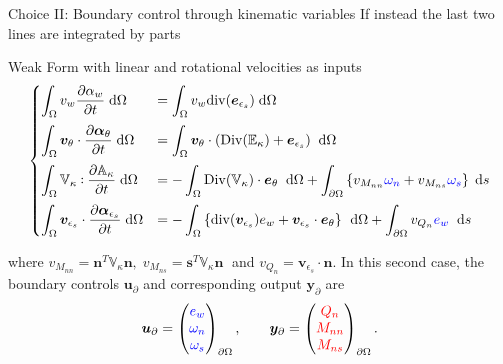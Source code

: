 \documentclass{beamer}
\def\onedot{$\mathsurround0pt\ldotp$}
\def\cddot{%
	\mathbin{\vcenter{\baselineskip.67ex
			\hbox{\onedot}\hbox{\onedot}}%
}}
\newcommand{\blue}[1]{\textcolor{blue}{#1}}
\newcommand{\red}[1]{\textcolor{red}{#1}}
\begin{document}
\begin{frame}{Choice II: Boundary control through kinematic variables}
	If instead the last two lines are integrated by parts
	\begin{exampleblock}{Weak Form with linear and rotational velocities as inputs}
	\scriptsize
	\begin{equation*}
	\begin{cases}
	\displaystyle\int_{\Omega} v_w \diffp{\alpha_w}{t}  \d\Omega  &= \displaystyle \int_{\Omega} v_w \mathrm{div}(\bm{e}_{\epsilon_s})  \d\Omega \vspace{2mm}\\
	\displaystyle\int_{\Omega} \bm{v}_{\theta} \cdot \diffp{\bm\alpha_{\theta}}{t}   \d\Omega &= \displaystyle \int_{\Omega} \bm{v}_{\theta} \cdot (\mathrm{Div}(\mathbb{E}_{\kappa}) + \bm{e}_{\epsilon_s}) \;  \d\Omega \vspace{2mm} \\
	\displaystyle\int_{\Omega} \mathbb{V}_{\kappa} \cddot \diffp{\mathbb{A}_{\kappa}}{t}   \d\Omega &= - \displaystyle\int_{\Omega} \mathrm{Div}(\mathbb{V}_{\kappa}) \cdot \bm{e}_\theta \;  \d\Omega +  \displaystyle\int_{\partial \Omega} \left\{ v_{M_{nn}} \blue{\omega_{n}} + v_{M_{ns}} \blue{\omega_{s}} \right\}  \d s \vspace{2mm} \\
	\displaystyle\int_{\Omega} \bm{v}_{\epsilon_s} \cdot \diffp{\bm\alpha_{\epsilon_s}}{t}   \d\Omega &=  - \displaystyle\int_{\Omega} \left\{ \mathrm{div}(\bm{v}_{\epsilon_s}) e_w + \bm{v}_{\epsilon_s} \cdot \bm{e}_{\theta} \right\} \, \d\Omega + \displaystyle\int_{\partial \Omega} v_{Q_{n}} \blue{e_{w}} \;  \d s
	\end{cases}
	\end{equation*}
	\end{exampleblock}
	\normalsize
	where $v_{M_{nn}} = \bm{n}^T \mathbb{V}_{\kappa} \bm{n}, \;  v_{M_{ns}} = \bm{s}^T \mathbb{V}_{\kappa} \bm{n} \;$ and $v_{Q_n} = \bm{v}_{\epsilon_s} \cdot \bm{n}$.
	In this second case,  the boundary controls $\bm{u}_\partial$ and corresponding output $\bm{y}_\partial$ are
	\[\bm{u}_\partial = 
	\begin{pmatrix}
	\blue{e_w} \\
	\blue{\omega_{n}} \\
	\blue{\omega_{s}} \\
	\end{pmatrix}_{\partial \Omega}, \qquad
	\bm{y}_\partial = 
	\begin{pmatrix}
	\red{Q_n} \\
	\red{M_{nn}} \\
	\red{M_{ns}} \\
	\end{pmatrix}_{\partial \Omega}.
	\]
\end{frame}
\end{document}
